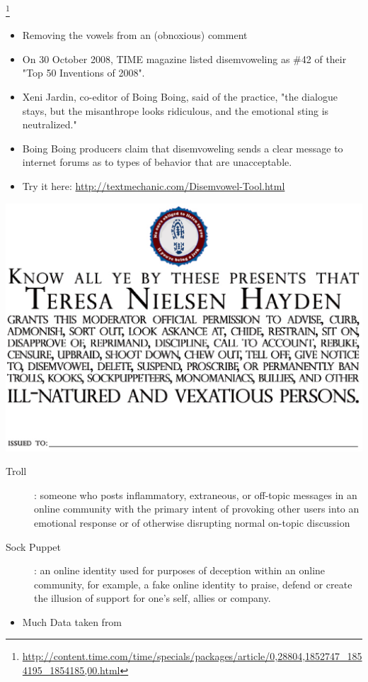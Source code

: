 \documentclass[a4paper,landscape,headrule,footrule,xetex]{foils}
\begin{document}
\footnote{\url{http://content.time.com/time/specials/packages/article/0,28804,1852747_1854195_1854185,00.html}}
\begin{itemize}
\item Removing the vowels from an (obnoxious) comment
\item On 30 October 2008, TIME magazine listed disemvoweling as \#42
  of their "Top 50 Inventions of 2008". %
\item Xeni Jardin, co-editor of Boing Boing, said of the practice, "the dialogue stays, but the misanthrope looks ridiculous, and the emotional sting is neutralized."
\item Boing Boing producers claim that disemvoweling sends a clear message to internet forums as to types of behavior that are unacceptable.
\item Try it here:
  \url{http://textmechanic.com/Disemvowel-Tool.html}
\end{itemize}

\begin{center}
  \includegraphics[height=\textheight]{../pics/moderate}
\end{center}


\begin{description}
\item[Troll]: someone who posts inflammatory, extraneous, or off-topic
  messages in an online community with the primary intent of provoking
  other users into an emotional response or of otherwise disrupting
  normal on-topic discussion

\item[Sock Puppet]: an online identity used for purposes of deception
  within an online community, for example, a fake online identity to
  praise, defend or create the illusion of support for one's self,
  allies or company.
\end{description}





\begin{itemize}
\item Much Data taken from \citet[ch 2,4--5,8]{Crystal:2006}
\end{itemize}



\end{document}
